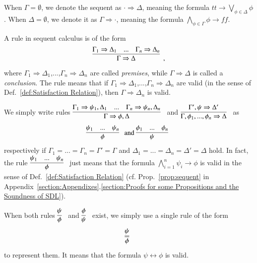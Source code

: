 \documentclass{fcs}
\newcommand{\true}[0]{\mathit{tt}}
\newcommand{\false}[0]{\mathit{ff}}
\newcommand{\seqArrow}[0]{\Rightarrow}
\begin{document}
When $\Gamma = \emptyset$, we denote the sequent as $\cdot \seqArrow \Delta$, meaning
the formula $\true \to \bigvee_{\phi\in \Delta}\phi$.
When $\Delta=\emptyset$, we denote it as $\Gamma\seqArrow \cdot$, meaning the formula $\bigwedge_{\phi\in\Gamma}\phi\to \false$.

A rule in sequent calculus is of the form
$$
\infer[]
{
    \Gamma\seqArrow \Delta
}
{
    \Gamma_1\seqArrow \Delta_1
    &
    ...
    &
    \Gamma_n\seqArrow \Delta_n
}
,$$
where $\Gamma_1\seqArrow \Delta_1$,...,$\Gamma_n\seqArrow \Delta_n$ are called \emph{premises}, while
$\Gamma\seqArrow \Delta$ is called a \emph{conclusion}.
The rule means that if $\Gamma_1\seqArrow \Delta_1$,...,$\Gamma_n\seqArrow \Delta_n$ are valid (in the sense of Def.~\ref{def:Satisfaction Relation}), then $\Gamma\seqArrow \Delta_n$ is valid.

We simply write rules
$\begin{aligned}\infer[]
{
    \Gamma\seqArrow \phi, \Delta
}
{
    \Gamma_1\seqArrow \psi_1, \Delta_1
    &
    ...
    &
    \Gamma_n\seqArrow \psi_n, \Delta_n
}\end{aligned}$
and
$\begin{aligned}\infer[]
{
    \Gamma, \phi_1,...,\phi_n\seqArrow \Delta
}
{
    \Gamma', \psi\seqArrow \Delta'
}\end{aligned}$
as
$$
\begin{aligned}
\infer[]
{
    \phi
}
{
    \psi_1
    &
    ...
    &
    \psi_n
}
\end{aligned}
\mbox{ and }
\begin{aligned}
\infer[]
{
    \psi
}
{
    \phi_1
    &
    ...
    &
    \phi_n
}
\end{aligned}
$$
respectively
if $\Gamma_1=...=\Gamma_n=\Gamma' = \Gamma$ and $\Delta_1=...=\Delta_n=\Delta' = \Delta$ hold.
In fact, the rule $\begin{aligned}\infer[]
{
    \phi
}
{
    \psi_1
    &
    ...
    &
    \psi_n
}\end{aligned}$
just means that the formula $\bigwedge^n_{i=1}\psi_i \to \phi$ is valid in the sense of Def.~\ref{def:Satisfaction Relation} (cf. Prop.~\ref{prop:sequent} in Appendix~\ref{section:Appendixes}.\ref{section:Proofs for some Propositions and the Soundness of SDL}).

When both rules $\begin{aligned}\infer[]{\phi}{\psi}\end{aligned}$ and $\begin{aligned}\infer[]{\psi}{\phi}\end{aligned}$ exist, we simply use a single rule of the form
$$
\infer=[]
{
    \phi
}
{
    \psi
}
$$
to represent them. It means that the formula $\psi \leftrightarrow \phi$ is valid.
\end{document}

